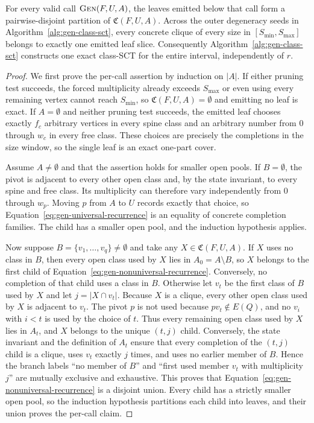 \begin{theorem}
\label{thm:gen-exact-cover}
For every valid call $\textsc{Gen}(F,U,A)$, the leaves emitted below that call form a pairwise-disjoint partition of $\mathfrak C(F,U,A)$.
%
Across the outer degeneracy seeds in Algorithm~\ref{alg:gen-class-sct}, every concrete clique of every size in $[S_{\min},S_{\max}]$ belongs to exactly one emitted leaf slice.
%
Consequently Algorithm~\ref{alg:gen-class-sct} constructs one exact class-SCT for the entire interval, independently of $r$.
\end{theorem}
\begin{proof}
We first prove the per-call assertion by induction on $|A|$.
%
If either pruning test succeeds, the forced multiplicity already exceeds $S_{\max}$ or even using every remaining vertex cannot reach $S_{\min}$, so $\mathfrak C(F,U,A)=\emptyset$ and emitting no leaf is exact.
%
If $A=\emptyset$ and neither pruning test succeeds, the emitted leaf chooses exactly $f_c$ arbitrary vertices in every spine class and an arbitrary number from $0$ through $w_c$ in every free class.
%
These choices are precisely the completions in the size window, so the single leaf is an exact one-part cover.

Assume $A\neq\emptyset$ and that the assertion holds for smaller open pools.
%
If $B=\emptyset$, the pivot is adjacent to every other open class and, by the state invariant, to every spine and free class.
%
Its multiplicity can therefore vary independently from $0$ through $w_p$.
%
Moving $p$ from $A$ to $U$ records exactly that choice, so Equation~\eqref{eq:gen-universal-recurrence} is an equality of concrete completion families.
%
The child has a smaller open pool, and the induction hypothesis applies.

Now suppose $B=\{v_1,\ldots,v_q\}\neq\emptyset$ and take any $X\in\mathfrak C(F,U,A)$.
%
If $X$ uses no class in $B$, then every open class used by $X$ lies in $A_0=A\setminus B$, so $X$ belongs to the first child of Equation~\eqref{eq:gen-nonuniversal-recurrence}.
%
Conversely, no completion of that child uses a class in $B$.
%
Otherwise let $v_t$ be the first class of $B$ used by $X$ and let $j=|X\cap v_t|$.
%
Because $X$ is a clique, every other open class used by $X$ is adjacent to $v_t$.
%
The pivot $p$ is not used because $pv_t\notin E(Q)$, and no $v_i$ with $i<t$ is used by the choice of $t$.
%
Thus every remaining open class used by $X$ lies in $A_t$, and $X$ belongs to the unique $(t,j)$ child.
%
Conversely, the state invariant and the definition of $A_t$ ensure that every completion of the $(t,j)$ child is a clique, uses $v_t$ exactly $j$ times, and uses no earlier member of $B$.
%
Hence the branch labels ``no member of $B$'' and ``first used member $v_t$ with multiplicity $j$'' are mutually exclusive and exhaustive.
%
This proves that Equation~\eqref{eq:gen-nonuniversal-recurrence} is a disjoint union.
%
Every child has a strictly smaller open pool, so the induction hypothesis partitions each child into leaves, and their union proves the per-call claim.


\end{proof}
